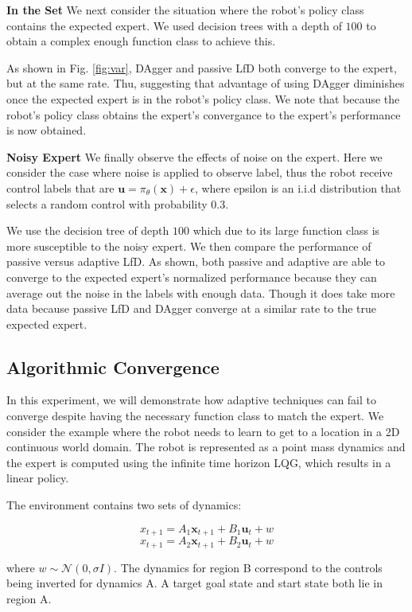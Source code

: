 \documentclass[10pt, conference]{ieeeconf}      %
\newcommand{\bu}{\mathbf{u}}
\newcommand{\bx}{\mathbf{x}}
\begin{document}
\noindent \textbf{In the Set}
We next consider the situation where the robot's policy class contains the expected expert. We used decision trees with a depth of $100$ to obtain a complex enough function class to achieve this. 

As shown in Fig. \ref{fig:var}, DAgger and passive LfD both converge to the expert, but at the same rate. Thu, suggesting that advantage of using DAgger diminishes once the expected expert is in the robot's policy class. We note that because the robot's policy class obtains the expert's convergance to the expert's performance is now obtained. 




\noindent \textbf{Noisy Expert}
We finally observe the effects of noise on the expert. Here we consider the case where noise is applied to observe label, thus the robot receive control labels that are $\bu = \pi_{\theta}(\bx) + \epsilon$,  where epsilon is an i.i.d distribution that selects a random control with probability $0.3$.

We use the  decision tree  of depth $100$ which due to its large function class is more susceptible to the noisy expert. We then compare the performance of passive versus adaptive LfD. As shown, both passive and adaptive are able to converge to the expected expert's normalized performance because they can average out the noise in the labels with enough data. Though it does take more data because passive LfD  and DAgger converge at a similar rate to the true expected expert. 




\subsection{Algorithmic Convergence }
In this experiment, we will demonstrate how adaptive techniques can fail to converge despite having the necessary function class to match the expert. 
We  consider the example where the robot needs to learn to get to a location in a 2D continuous world domain. The robot is represented as a point mass dynamics and the expert is computed using the infinite time horizon LQG, which results in a linear policy. 

The environment contains two sets of dynamics: 

$$x_{t+1} = A_1\bx_{t+1}+B_1\bu_t+w$$
$$x_{t+1} = A_2\bx_{t+1}+B_2\bu_t + w$$

where $w\sim \mathcal{N}(0,\sigma I)$. The dynamics for region B correspond to the controls being inverted for dynamics A. A target goal state and start state both lie in region A. 
\end{document}
